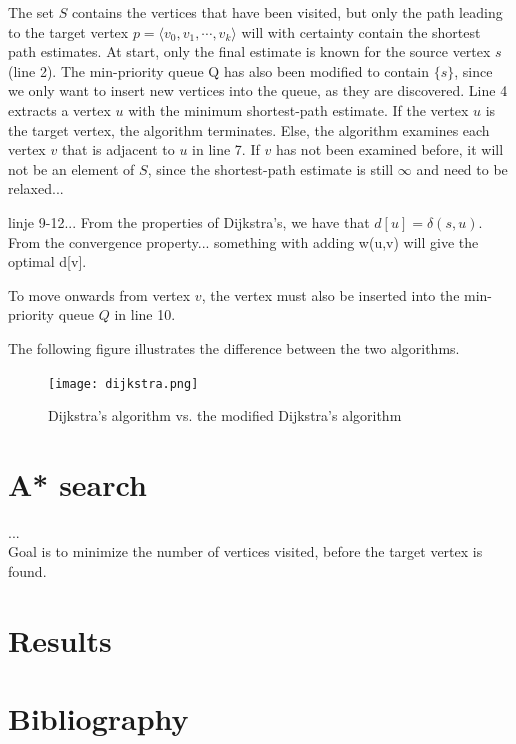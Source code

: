 \documentclass[11pt]{article}
\begin{document}
The set $S$ contains the vertices that have been visited, but only the path leading to the target vertex $p = \langle v_0, v_1, \cdots, v_k\rangle$ will with certainty contain the shortest path estimates. At start, only the final estimate is known for the source vertex $s$ (line 2). The min-priority queue Q has also been modified to contain $\{s\}$, since we only want to insert new vertices into the queue, as they are discovered. Line 4 extracts a vertex $u$ with the minimum shortest-path estimate. If the vertex $u$ is the target vertex, the algorithm terminates. Else, the algorithm examines each vertex $v$ that is adjacent to $u$ in line 7. If $v$ has not been examined before, it will not be an element of $S$, since the shortest-path estimate is still $\infty$ and need to be relaxed...




linje 9-12...
From the properties of Dijkstra's, we have that $d[u] = \delta(s,u)$. 
From the convergence property... something with adding w(u,v) will give the optimal d[v]. 

To move onwards from vertex $v$, the vertex must also be inserted into the min-priority queue $Q$ in line 10.




\noindent The following figure illustrates the difference between the two algorithms.\\
\begin{figure}[H]
\centering
\texttt{[image: dijkstra.png]}
\caption{Dijkstra's algorithm vs. the modified Dijkstra's algorithm}
\end{figure}


\section{A* search}
...\\
Goal is to minimize the number of vertices visited, before the target vertex is found.


\section{Results}
\section{Bibliography}
\end{document}
